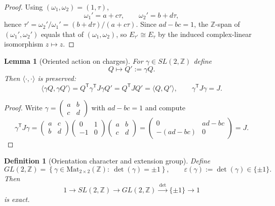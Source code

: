 \documentclass[11pt]{article}
\newtheorem{lemma}[theorem]{Lemma}
\newtheorem{definition}[theorem]{Definition}
\theoremstyle{remark}
\begin{document}
\begin{proof}
Using $(\omega_{1},\omega_{2})=(1,\tau)$,
\begin{equation}
\omega_{1}'=a+c\tau,\qquad \omega_{2}'=b+d\tau,
\end{equation}
hence $\tau'=\omega_{2}'/\omega_{1}'=(b+d\tau)/(a+c\tau)$.
Since $ad-bc=1$, the $\mathbb Z$-span of $(\omega_{1}',\omega_{2}')$ equals that of $(\omega_{1},\omega_{2})$, so $E_{\tau'}\cong E_{\tau}$ by the induced complex-linear isomorphism $z\mapsto z$.
\end{proof}

\begin{lemma}[Oriented action on charges]
\label{C:SL_action_charge}
For $\gamma\in SL(2,\mathbb Z)$ define
\begin{equation}
Q\longmapsto Q' := \gamma Q.
\label{C:charge_SL}
\end{equation}
Then $\langle\cdot,\cdot\rangle$ is preserved:
\begin{equation}
\langle \gamma Q,\gamma Q'\rangle
=
Q^{\mathsf T}\gamma^{\mathsf T}J\gamma Q'
=
Q^{\mathsf T}JQ'
=
\langle Q,Q'\rangle,
\qquad
\gamma^{\mathsf T}J\gamma=J.
\label{C:sympl_SL}
\end{equation}
\end{lemma}

\begin{proof}
Write $\gamma=\begin{pmatrix}a&b\\c&d\end{pmatrix}$ with $ad-bc=1$ and compute
\begin{equation}
\gamma^{\mathsf T}J\gamma
=
\begin{pmatrix}a&c\\ b&d\end{pmatrix}
\begin{pmatrix}0&1\\-1&0\end{pmatrix}
\begin{pmatrix}a&b\\ c&d\end{pmatrix}
=
\begin{pmatrix}0&ad-bc\\ -(ad-bc)&0\end{pmatrix}
=
J.
\end{equation}
\end{proof}

\begin{definition}[Orientation character and extension group]
Define
\begin{equation}
GL(2,\mathbb Z)
=
\left\{\gamma\in \mathrm{Mat}_{2\times 2}(\mathbb Z):\ \det(\gamma)=\pm 1\right\},
\qquad
\varepsilon(\gamma):=\det(\gamma)\in\{\pm 1\}.
\label{C:GL_det}
\end{equation}
Then
\begin{equation}
1\longrightarrow SL(2,\mathbb Z)\longrightarrow GL(2,\mathbb Z)\xrightarrow{\ \det\ }\{\pm 1\}\longrightarrow 1
\label{C:exact_GL}
\end{equation}
is exact.
\end{definition}
\end{document}
